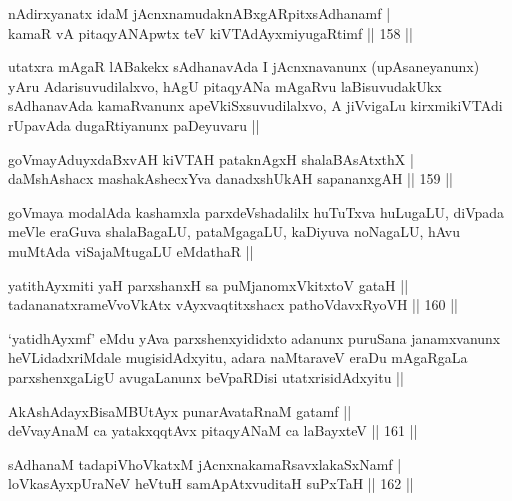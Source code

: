 \begin{shl}
nA\s \s dirxyanatx idaM jAcnxnamudaknABxgARpitxsAdhanamf | \\
kamaR vA pitaqyANApwtx teV kiVTAdAyxmiyugaRtimf \hfill|| 158 || 
\end{shl}

\begin{artha}
utatxra mAgaR lABakekx sAdhanavAda I jAcnxnavanunx (upAsaneyanunx)
yAru Adarisuvudilalxvo, hAgU pitaqyANa mAgaRvu laBisuvudakUkx
sAdhanavAda kamaRvanunx apeVkiSxsuvudilalxvo, A jiVvigaLu
kirxmikiVTAdi rUpavAda dugaRtiyanunx paDeyuvaru ||
\end{artha}

\begin{shl}
goVmayAduyxdaBxvAH kiVTAH pataknAgxH shalaBAsAtxthX | \\
daMshAshacx mashakAshecxYva danadxshUkAH sapananxgAH \hfill|| 159 || 
\end{shl}

\begin{artha}
goVmaya modalAda kashamxla parxdeVshadalilx huTuTxva huLugaLU, diVpada meVle eraGuva shalaBagaLU, pataMgagaLU, kaDiyuva noNagaLU, hAvu muMtAda viSajaMtugaLU eMdathaR ||
\end{artha}


\begin{shl}
yatithAyxmiti yaH parxshanxH sa puMjanomxVkitxtoV gataH || \\
tadananatxrameVvoVkAtx vAyxvaqtitxshacx pathoVdavxRyoVH \hfill|| 160 || 
\end{shl}

\begin{artha}
`yatidhAyxmf' eMdu yAva parxshenxyididxto adanunx puruSana janamxvanunx heVLidadxriMdale mugisidAdxyitu, adara naMtaraveV eraDu mAgaRgaLa parxshenxgaLigU avugaLanunx beVpaRDisi utatxrisidAdxyitu ||
\end{artha}

\begin{shl}
AkAshAdayxBisaMBUtAyx punarAvataRnaM gatamf || \\
deVvayAnaM ca yatakxqqtAvx pitaqyANaM ca laBayxteV \hfill|| 161 || 
\end{shl}

\begin{shl}
sAdhanaM tadapiVhoVkatxM jAcnxnakamaRsavxlakaSxNamf | \\
loVkasAyxpUraNeV heVtuH samApAtxvuditaH suPxTaH \hfill|| 162 || 
\end{shl}

